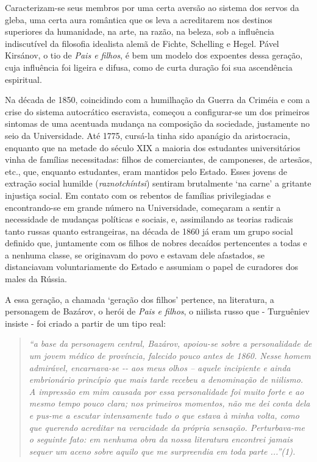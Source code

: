 Caracterizam-se seus membros por uma certa aversão ao sistema dos servos
da gleba, uma certa aura romântica que os leva a acreditarem nos
destinos superiores da humanidade, na arte, na razão, na beleza, sob a
influência indiscutível da filosofia idealista alemã de Fichte,
Schelling e Hegel. Pável Kirsánov, o tio de \emph{Pais e filhos}, é bem
um modelo dos expoentes dessa geração, cuja influência foi ligeira e
difusa, como de curta duração foi sua ascendência espiritual.

Na década de 1850, coincidindo com a humilhação da Guerra da Criméia e
com a crise do sistema autocrático escravista, começou a configurar-se
um dos primeiros sintomas de uma acentuada mudança na composição da
sociedade, justamente no seio da Universidade. Até 1775, cursá-la tinha
sido apanágio da aristocracia, enquanto que na metade do século XIX a
maioria dos estudantes universitários vinha de famílias necessitadas:
filhos de comerciantes, de camponeses, de artesãos, etc., que, enquanto
estudantes, eram mantidos pelo Estado. Esses jovens de extração social
humilde (\emph{raznotchíntsi}) sentiram brutalmente `na carne' a
gritante injustiça social. Em contato com os rebentos de famílias
privilegiadas e encontrando-se em grande número na Universidade,
começaram a sentir a necessidade de mudanças políticas e sociais, e,
assimilando as teorias radicais tanto russas quanto estrangeiras, na
década de 1860 já eram um grupo social definido que, juntamente com os
filhos de nobres decaídos pertencentes a todas e a nenhuma classe, se
originavam do povo e estavam dele afastados, se distanciavam
voluntariamente do Estado e assumiam o papel de curadores dos males da
Rússia.

A essa geração, a chamada `geração dos filhos' pertence, na literatura,
a personagem de Bazárov, o herói de \emph{Pais e filhos}, o niilista
russo que - Turguêniev insiste - foi criado a partir de um tipo real:

\begin{quote}
\emph{``a base da personagem central, Bazárov, apoiou-se sobre a
personalidade de um jovem médico de província, falecido pouco antes de
1860. Nesse homem admirável, encarnava-se -\/- aos meus olhos -- aquele
incipiente e ainda embrionário princípio que mais tarde recebeu a
denominação de niilismo. A impressão em mim causada por essa
personalidade foi muito forte e ao mesmo tempo pouco clara; nos
primeiros momentos, não me dei conta dela e pus-me a escutar
intensamente tudo o que estava à minha volta, como que querendo
acreditar na veracidade da própria sensação. Perturbava-me o seguinte
fato: em nenhuma obra da nossa literatura encontrei jamais sequer um
aceno sobre aquilo que me surpreendia em toda parte ...''(1).}
\end{quote}

